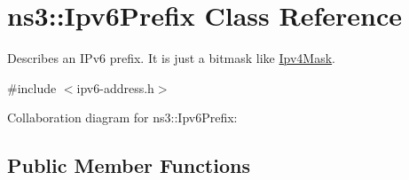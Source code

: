\hypertarget{classns3_1_1Ipv6Prefix}{}\section{ns3\+:\+:Ipv6\+Prefix Class Reference}
\label{classns3_1_1Ipv6Prefix}


Describes an I\+Pv6 prefix. It is just a bitmask like \hyperlink{classns3_1_1Ipv4Mask}{Ipv4\+Mask}.  




{\ttfamily \#include $<$ipv6-\/address.\+h$>$}



Collaboration diagram for ns3\+:\+:Ipv6\+Prefix\+:
\subsection*{Public Member Functions}
